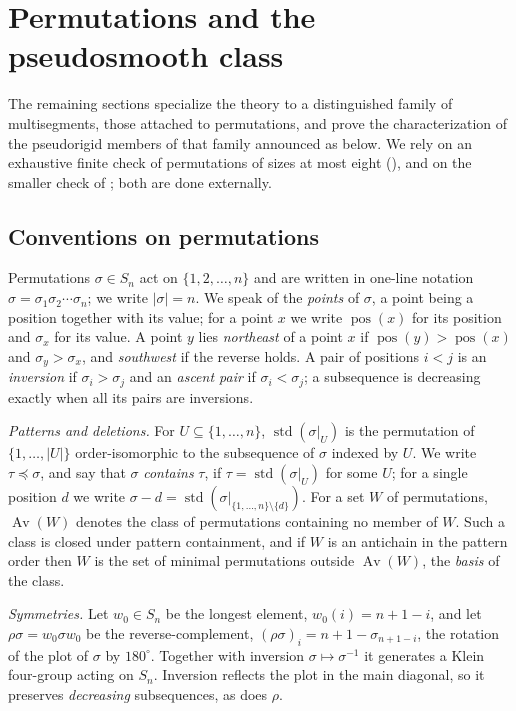 \documentclass[12pt]{article}
\def\xspace{ }%
\theoremstyle{definition}
\newcommand{\prig}{pseudorigid\xspace}
\newcommand{\psm}{pseudosmooth\xspace}
\newcommand{\wo}{w_0}                 %
\newcommand{\rc}{\rho}                %
\newcommand{\Av}{\operatorname{Av}}
\newcommand{\std}{\operatorname{std}}
\newcommand{\ptst}{U}                  %
\newcommand{\pos}{\operatorname{pos}}  %
\begin{document}
\section{Permutations and the \psm class}\label{sec:perm}

The remaining sections specialize the theory to a distinguished family of
multisegments, those attached to permutations, and prove the
characterization of the \prig members of that family announced as
 below. We rely on an exhaustive finite check of permutations of sizes at most eight
(), and on the smaller check of ;
both are done externally.

\subsection{Conventions on permutations}\label{ssec:permconv}

Permutations $\sigma \in S_n$ act on $\{1,2,\dots,n\}$ and are written
in one-line notation $\sigma = \sigma_1\sigma_2\cdots\sigma_n$; we
write $|\sigma| = n$. We speak of the \emph{points} of $\sigma$, a point
being a position together with its value; for a point $x$ we write
$\pos(x)$ for its position and $\sigma_x$ for its value. A point $y$ lies
\emph{northeast} of a point $x$ if $\pos(y) > \pos(x)$ and $\sigma_y >
\sigma_x$, and \emph{southwest} if the reverse holds. A pair of positions
$i<j$ is an \emph{inversion} if $\sigma_i > \sigma_j$ and an \emph{ascent
pair} if $\sigma_i < \sigma_j$; a subsequence is decreasing exactly when
all its pairs are inversions.

\emph{Patterns and deletions.} For $\ptst \subseteq \{1,\dots,n\}$,
$\std(\sigma|_{\ptst})$ is the permutation of $\{1,\dots,|\ptst|\}$
order-isomorphic to the subsequence of $\sigma$ indexed by $\ptst$. We write
$\tau \preceq \sigma$, and say that $\sigma$ \emph{contains} $\tau$, if
$\tau = \std(\sigma|_{\ptst})$ for some $\ptst$; for a single position $d$ we write
$\sigma - d = \std(\sigma|_{\{1,\dots,n\}\setminus\{d\}})$. For a set
$W$ of permutations, $\Av(W)$ denotes the class of permutations
containing no member of $W$. Such a class is closed under pattern
containment, and if $W$ is an antichain in the pattern order then $W$ is
the set of minimal permutations outside $\Av(W)$, the \emph{basis} of the
class.

\emph{Symmetries.} Let $\wo \in S_n$ be the longest element, $\wo(i) =
n+1-i$, and let $\rc\sigma = \wo\sigma\wo$ be the reverse-complement,
$(\rc\sigma)_i = n+1-\sigma_{n+1-i}$, the rotation of the plot of
$\sigma$ by $180^\circ$. Together with inversion $\sigma \mapsto
\sigma^{-1}$ it generates a Klein four-group acting on $S_n$.
Inversion reflects the plot in the main diagonal, so it preserves
\emph{decreasing} subsequences, as does $\rc$.
\end{document}
